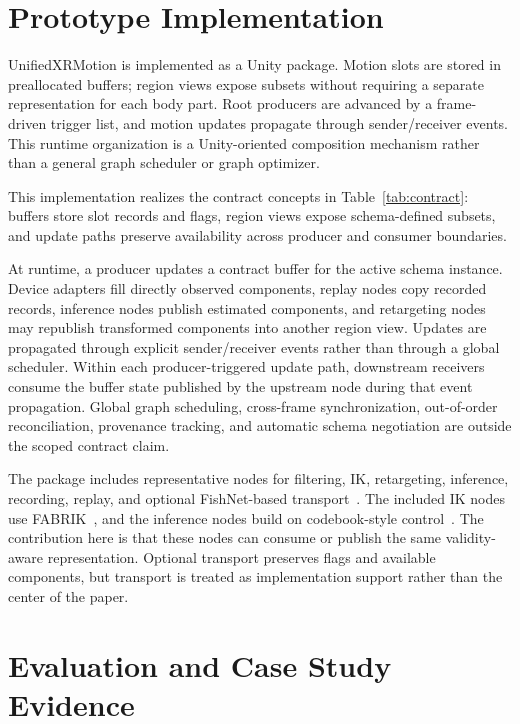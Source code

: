 \documentclass[runningheads]{llncs}
\begin{document}
\section{Prototype Implementation}\label{sec:implementation}
UnifiedXRMotion is implemented as a Unity package. Motion slots are stored in preallocated buffers; region views expose subsets without requiring a separate representation for each body part. Root producers are advanced by a frame-driven trigger list, and motion updates propagate through sender/receiver events. This runtime organization is a Unity-oriented composition mechanism rather than a general graph scheduler or graph optimizer.

This implementation realizes the contract concepts in Table~\ref{tab:contract}: buffers store slot records and flags, region views expose schema-defined subsets, and update paths preserve availability across producer and consumer boundaries.

At runtime, a producer updates a contract buffer for the active schema instance. Device adapters fill directly observed components, replay nodes copy recorded records, inference nodes publish estimated components, and retargeting nodes may republish transformed components into another region view. Updates are propagated through explicit sender/receiver events rather than through a global scheduler. Within each producer-triggered update path, downstream receivers consume the buffer state published by the upstream node during that event propagation. Global graph scheduling, cross-frame synchronization, out-of-order reconciliation, provenance tracking, and automatic schema negotiation are outside the scoped contract claim.

The package includes representative nodes for filtering, IK, retargeting, inference, recording, replay, and optional FishNet-based transport~\cite{fishnet}. The included IK nodes use FABRIK~\cite{aristidou2011fabrik}, and the inference nodes build on codebook-style control~\cite{starke2024categorical}. The contribution here is that these nodes can consume or publish the same validity-aware representation. Optional transport preserves flags and available components, but transport is treated as implementation support rather than the center of the paper.

\section{Evaluation and Case Study Evidence}\label{sec:evaluation}
\end{document}
